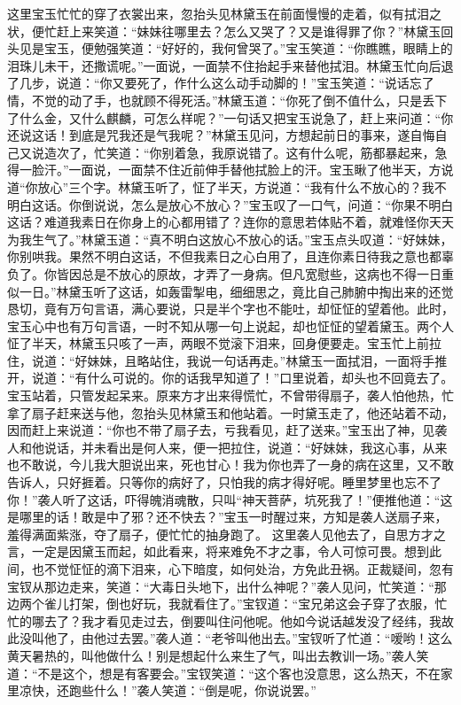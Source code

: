 \documentclass[12pt,oneside]{book}
\begin{document}
这里宝玉忙忙的穿了衣裳出来，忽抬头见林黛玉在前面慢慢的走着，似有拭泪之状，便忙赶上来笑道：“妹妹往哪里去？怎么又哭了？又是谁得罪了你？”林黛玉回头见是宝玉，便勉强笑道：“好好的，我何曾哭了。”宝玉笑道：“你瞧瞧，眼睛上的泪珠儿未干，还撒谎呢。”一面说，一面禁不住抬起手来替他拭泪。林黛玉忙向后退了几步，说道：“你又要死了，作什么这么动手动脚的！”宝玉笑道：“说话忘了情，不觉的动了手，也就顾不得死活。”林黛玉道：“你死了倒不值什么，只是丢下了什么金，又什么麒麟，可怎么样呢？”一句话又把宝玉说急了，赶上来问道：“你还说这话！到底是咒我还是气我呢？”林黛玉见问，方想起前日的事来，遂自悔自己又说造次了，忙笑道：“你别着急，我原说错了。这有什么呢，筋都暴起来，急得一脸汗。”一面说，一面禁不住近前伸手替他拭脸上的汗。宝玉瞅了他半天，方说道“你放心”三个字。林黛玉听了，怔了半天，方说道：“我有什么不放心的？我不明白这话。你倒说说，怎么是放心不放心？”宝玉叹了一口气，问道：“你果不明白这话？难道我素日在你身上的心都用错了？连你的意思若体贴不着，就难怪你天天为我生气了。”林黛玉道：“真不明白这放心不放心的话。”宝玉点头叹道：“好妹妹，你别哄我。果然不明白这话，不但我素日之心白用了，且连你素日待我之意也都辜负了。你皆因总是不放心的原故，才弄了一身病。但凡宽慰些，这病也不得一日重似一日。”林黛玉听了这话，如轰雷掣电，细细思之，竟比自己肺腑中掏出来的还觉恳切，竟有万句言语，满心要说，只是半个字也不能吐，却怔怔的望着他。此时，宝玉心中也有万句言语，一时不知从哪一句上说起，却也怔怔的望着黛玉。两个人怔了半天，林黛玉只咳了一声，两眼不觉滚下泪来，回身便要走。宝玉忙上前拉住，说道：“好妹妹，且略站住，我说一句话再走。”林黛玉一面拭泪，一面将手推开，说道：“有什么可说的。你的话我早知道了！”口里说着，却头也不回竟去了。
宝玉站着，只管发起呆来。原来方才出来得慌忙，不曾带得扇子，袭人怕他热，忙拿了扇子赶来送与他，忽抬头见林黛玉和他站着。一时黛玉走了，他还站着不动，因而赶上来说道：“你也不带了扇子去，亏我看见，赶了送来。”宝玉出了神，见袭人和他说话，并未看出是何人来，便一把拉住，说道：“好妹妹，我这心事，从来也不敢说，今儿我大胆说出来，死也甘心！我为你也弄了一身的病在这里，又不敢告诉人，只好捱着。只等你的病好了，只怕我的病才得好呢。睡里梦里也忘不了你！”袭人听了这话，吓得魄消魂散，只叫“神天菩萨，坑死我了！”便推他道：“这是哪里的话！敢是中了邪？还不快去？”宝玉一时醒过来，方知是袭人送扇子来，羞得满面紫涨，夺了扇子，便忙忙的抽身跑了。
这里袭人见他去了，自思方才之言，一定是因黛玉而起，如此看来，将来难免不才之事，令人可惊可畏。想到此间，也不觉怔怔的滴下泪来，心下暗度，如何处治，方免此丑祸。正裁疑间，忽有宝钗从那边走来，笑道：“大毒日头地下，出什么神呢？”袭人见问，忙笑道：“那边两个雀儿打架，倒也好玩，我就看住了。”宝钗道：“宝兄弟这会子穿了衣服，忙忙的哪去了？我才看见走过去，倒要叫住问他呢。他如今说话越发没了经纬，我故此没叫他了，由他过去罢。”袭人道：“老爷叫他出去。”宝钗听了忙道：“嗳哟！这么黄天暑热的，叫他做什么！别是想起什么来生了气，叫出去教训一场。”袭人笑道：“不是这个，想是有客要会。”宝钗笑道：“这个客也没意思，这么热天，不在家里凉快，还跑些什么！”袭人笑道：“倒是呢，你说说罢。”
\end{document}
